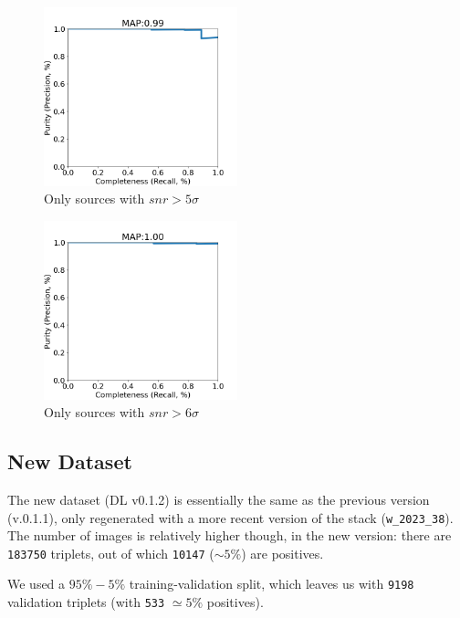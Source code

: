 \documentclass[DM,authoryear,toc]{lsstdoc}
\begin{document}
\begin{figure}[h]
  \centering
  \includegraphics[width=0.5\textwidth]{precrec___checkpoint_epoch0000087_0200000____rbdata_data_npy_data_gt1M-5sigma___posw_30.png}
  \caption{Only sources with $snr > 5\sigma$}
  \label{fig:tract_templates}
\end{figure}

\begin{figure}[h]
  \centering
  \includegraphics[width=0.5\textwidth]{precrec___checkpoint_epoch0000087_0200000____rbdata_data_npy_data_gt1M-6sigma___posw_30.png}
  \caption{Only sources with $snr > 6\sigma$}
  \label{fig:tract_templates}
\end{figure}

\clearpage
\subsection{New Dataset}
The new dataset (DL v0.1.2) is essentially the same as the previous version (v.0.1.1), only regenerated with a more recent version of the stack (\texttt{w\_2023\_38}). The number of images is relatively higher though, in the new version: there are \texttt{183750} triplets, out of which \texttt{10147} ($\sim 5\%$) are positives.

We used a $95\%-5\%$ training-validation split, which leaves us with \texttt{9198} validation triplets (with \texttt{533} $\simeq 5\%$ positives).
\end{document}
